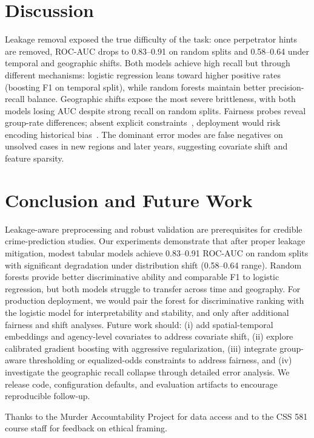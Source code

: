 \documentclass[sigconf]{acmart}
\begin{document}
\section{Discussion}
Leakage removal exposed the true difficulty of the task: once perpetrator hints are removed, ROC-AUC drops to 0.83--0.91 on random splits and 0.58--0.64 under temporal and geographic shifts. Both models achieve high recall but through different mechanisms: logistic regression leans toward higher positive rates (boosting F1 on temporal split), while random forests maintain better precision-recall balance. Geographic shifts expose the most severe brittleness, with both models losing AUC despite strong recall on random splits. Fairness probes reveal group-rate differences; absent explicit constraints~\cite{hardt2016equality}, deployment would risk encoding historical bias~\cite{lum2016predictive}. The dominant error modes are false negatives on unsolved cases in new regions and later years, suggesting covariate shift and feature sparsity.

\section{Conclusion and Future Work}
Leakage-aware preprocessing and robust validation are prerequisites for credible crime-prediction studies. Our experiments demonstrate that after proper leakage mitigation, modest tabular models achieve 0.83--0.91 ROC-AUC on random splits with significant degradation under distribution shift (0.58--0.64 range). Random forests provide better discriminative ability and comparable F1 to logistic regression, but both models struggle to transfer across time and geography. For production deployment, we would pair the forest for discriminative ranking with the logistic model for interpretability and stability, and only after additional fairness and shift analyses. Future work should: (i) add spatial-temporal embeddings and agency-level covariates to address covariate shift, (ii) explore calibrated gradient boosting with aggressive regularization, (iii) integrate group-aware thresholding or equalized-odds constraints to address fairness, and (iv) investigate the geographic recall collapse through detailed error analysis. We release code, configuration defaults, and evaluation artifacts to encourage reproducible follow-up.

\begin{acks}
Thanks to the Murder Accountability Project for data access and to the CSS 581 course staff for feedback on ethical framing.
\end{acks}



\end{document}
